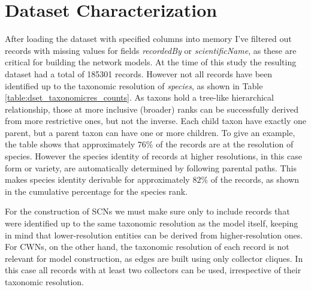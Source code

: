 \section{Dataset Characterization}


After loading the dataset with specified columns into memory I've filtered out records with missing values for fields \textit{recordedBy} or \textit{scientificName}, as these are critical for building the network models.
At the time of this study the resulting dataset had a total of 185301 records. However not all records have been identified up to the taxonomic resolution of \textit{species}, as shown in Table \ref{table:dset_taxonomicres_counts}. 
As taxons hold a tree-like hierarchical relationship, those at more inclusive (broader) ranks can be successfully derived from more restrictive ones, but not the inverse. Each child taxon have exactly one parent, but a parent taxon can have one or more children.
To give an example, the table shows that approximately $76\%$ of the records are at the resolution of species. However the species identity of records at higher resolutions, in this case form or variety, are automatically determined by following parental paths. This makes species identity derivable for approximately $82\%$ of the records, as shown in the cumulative percentage for the species rank.

For the construction of SCNs we must make sure only to include records that were identified up to the same taxonomic resolution as the model itself, keeping in mind that lower-resolution entities can be derived from higher-resolution ones. 
For CWNs, on the other hand, the taxonomic resolution of each record is not relevant for model construction, as edges are built using only collector cliques. In this case all records with at least two collectors can be used, irrespective of their taxonomic resolution.

